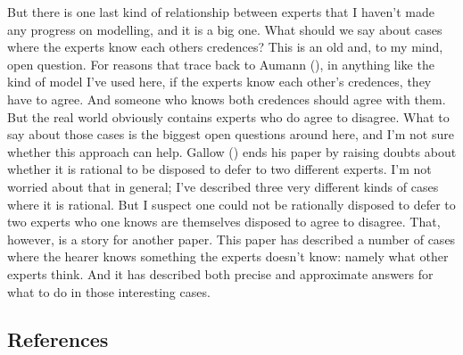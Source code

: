 \documentclass[
  11pt,
  letterpaper,
  DIV=11,
  numbers=noendperiod,
  twoside]{scrartcl}
\begin{document}
But there is one last kind of relationship between experts that I
haven't made any progress on modelling, and it is a big one. What should
we say about cases where the experts know each others credences? This is
an old and, to my mind, open question. For reasons that trace back to
Aumann (), in anything like the kind of
model I've used here, if the experts know each other's credences, they
have to agree. And someone who knows both credences should agree with
them. But the real world obviously contains experts who do agree to
disagree. What to say about those cases is the biggest open questions
around here, and I'm not sure whether this approach can help. Gallow
() ends his paper by raising doubts about
whether it is rational to be disposed to defer to two different experts.
I'm not worried about that in general; I've described three very
different kinds of cases where it is rational. But I suspect one could
not be rationally disposed to defer to two experts who one knows are
themselves disposed to agree to disagree. That, however, is a story for
another paper. This paper has described a number of cases where the
hearer knows something the experts doesn't know: namely what other
experts think. And it has described both precise and approximate answers
for what to do in those interesting cases.

\subsection*{References}\label{references}
\end{document}
